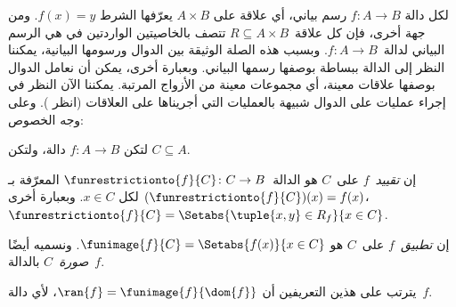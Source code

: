 \documentclass[../../../include/open-logic-section]{subfiles}
\begin{document}
\begin{explain}
لكل دالة $f\colon A \to B$ رسم بياني، أي علاقة على $A
\times B$ يعرّفها الشرط $f(x) = y$. ومن جهة أخرى، فإن كل علاقة~$R
\subseteq A \times B$ تتصف بالخاصيتين الواردتين في
 هي الرسم البياني لدالة~$f \colon A \to
B$. وبسبب هذه الصلة الوثيقة بين الدوال ورسومها البيانية، يمكننا
النظر إلى الدالة ببساطة بوصفها رسمها البياني. وبعبارة أخرى، يمكن
أن نعامل الدوال بوصفها علاقات معينة، أي مجموعات معينة من الأزواج المرتبة.
يمكننا الآن
النظر في إجراء عمليات على الدوال شبيهة بالعمليات التي أجريناها على
العلاقات (انظر ). وعلى وجه الخصوص:
\end{explain}

\begin{defn}
لتكن $f \colon A \to B$ دالة، ولتكن $C\subseteq A$.

إن \emph{تقييد}~$f$ على~$C$ هو
الدالة~$\funrestrictionto{f}{C}\colon C \to B$ المعرّفة بـ
$(\funrestrictionto{f}{C})(x) = f(x)$ لكل $x \in C$. وبعبارة
أخرى، $\funrestrictionto{f}{C} = \Setabs{\tuple{x, y} \in R_f}{x \in
C}$.

إن \emph{تطبيق}~$f$ على~$C$ هو $\funimage{f}{C} =
\Setabs{f(x)}{x \in C}$. ونسميه أيضًا \emph{صورة}~$C$
بالدالة~$f$.
\end{defn}

\begin{explain}
يترتب على هذين التعريفين أن $\ran{f} =
\funimage{f}{\dom{f}}$، لأي دالة~$f$.
\end{explain}
\end{document}
